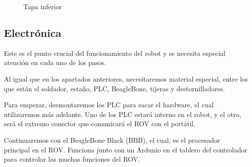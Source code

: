 \begin{figure}[hbtp]
  \begin{center}
  \end{center}
  \caption{Tapa inferior}
  \label{fig:tapa_iferior}
\end{figure}

\subsection{Electrónica}
\label{subsec:electronica}

Este es el punto crucial del funcionamiento del robot y se necesita especial atención en cada uno de los pasos. 

Al igual que en los apartados anteriores, necesitaremos material especial, entre los que están el soldador, estaño, PLC, BeagleBone, tijeras y destornilladores.

Para empezar, desmontaremos los PLC para sacar el hardware, el cual utilizaremos más adelante.
Uno de los PLC estará interno en el robot, y el otro, será el extremo conector que comunicará el ROV con el portátil.

Continuaremos con el BeagleBone Black (BBB), el cual, es el procesador principal en el ROV. Funciona junto con un Ardunio en el tablero del controlador para controlar las muchas funciones del ROV.

